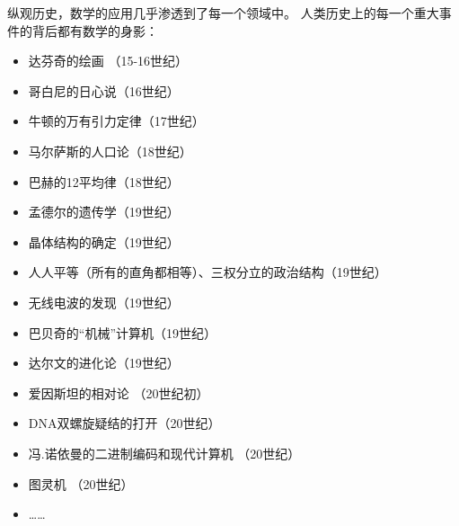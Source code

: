 纵观历史，数学的应用几乎渗透到了每一个领域中。
人类历史上的每一个重大事件的背后都有数学的身影：
\begin{itemize}
\item 达芬奇的绘画 （15-16世纪）
\item 哥白尼的日心说（16世纪）
\item 牛顿的万有引力定律（17世纪）
\item 马尔萨斯的人口论（18世纪）
\item 巴赫的12平均律（18世纪）
\item 孟德尔的遗传学（19世纪）
\item 晶体结构的确定（19世纪）
\item 人人平等（所有的直角都相等）、三权分立的政治结构（19世纪）
\item 无线电波的发现（19世纪）
\item 巴贝奇的“机械”计算机（19世纪）
\item 达尔文的进化论（19世纪）
\item 爱因斯坦的相对论 （20世纪初）
\item DNA双螺旋疑结的打开（20世纪）
\item 冯.诺依曼的二进制编码和现代计算机 （20世纪）
\item 图灵机 （20世纪）
\item ……
\end{itemize}


\nocite{*}
\printbibliography[heading=bibintoc, title=\ebibname]
\appendix

\newpage
